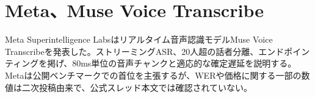 \section{Meta、Muse Voice Transcribe}
Meta Superintelligence Labsはリアルタイム音声認識モデルMuse Voice Transcribeを発表した。ストリーミングASR、20人超の話者分離、エンドポインティングを掲げ、80ms単位の音声チャンクと適応的な確定遅延を説明する。Metaは公開ベンチマークでの首位を主張するが、WERや価格に関する一部の数値は二次投稿由来で、公式スレッド本文では確認されていない。

